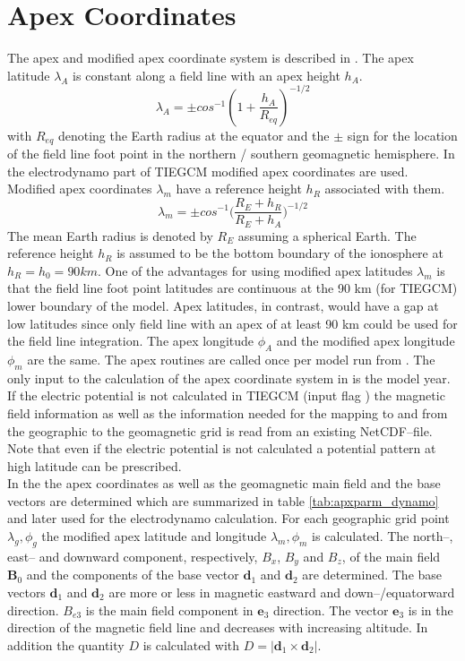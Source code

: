 %
\section{Apex Coordinates}\label{cap:apex_coord}
%
The apex and modified apex coordinate system is described in \cite{rich95}. The
apex latitude $\lambda_A$ is constant along a field line with an apex height
$h_A$. 
%
\begin{equation}
    \lambda_A = \pm cos^{-1} (1+\frac{h_A}{R_{eq}})^{-1/2}
\end{equation}
%
with $R_{eq}$ denoting the Earth radius at the equator and the 
$\pm$ sign for the location of the field line foot point in the
northern / southern  geomagnetic hemisphere. In the electrodynamo part of TIEGCM
modified apex coordinates are used. Modified apex coordinates $\lambda_m$ 
have a reference height $h_R$ associated with them.
%
\begin{equation}
    \lambda_m = \pm cos^{-1} \bigl( \frac{R_E + h_R}{R_E + h_A} \bigr)^{-1/2}
\end{equation}
%
The mean Earth radius is denoted by $R_E$ assuming a spherical Earth.
The reference height $h_R$ is assumed to be the bottom boundary of the ionosphere 
at $h_R = h_0 = 90 km$.
One of the advantages for using modified apex
latitudes $\lambda_m$ is that the field line foot point latitudes are 
continuous at the 90 km (for TIEGCM) lower boundary
of the model. Apex latitudes, in contrast, would have a gap at low
latitudes since only field line with an apex of at least 90 km could be used for 
the field line integration. 
The apex longitude $\phi_A$ and the modified apex longitude $\phi_m$ are the same.
The apex routines are called once per model run from . The
only input to the calculation of the apex coordinate system in  is the model year. If the electric potential is not calculated
in TIEGCM (input flag ) the magnetic field information as 
well as the
information needed for the mapping to and from the geographic to the 
geomagnetic grid
is read from an existing NetCDF--file. Note that even if the electric 
potential is not calculated a potential pattern at high latitude can be
prescribed. \\

In the  the apex coordinates as well as the geomagnetic
main field and the base vectors are determined which are summarized in table
\ref{tab:apxparm_dynamo} and later used for the electrodynamo calculation. 
For each geographic grid point $\lambda_g, \phi_g$ the modified apex latitude and longitude 
$\lambda_m,
\phi_m$ is calculated. The north--, east-- and downward component, respectively, 
$B_x$, $B_y$ and 
$B_z$, of the main  field $\mathbf{B}_0$ and the components of the base vector
$\mathbf{d}_1$ and $\mathbf{d}_2$ are determined. The base vectors 
$\mathbf{d}_1$ 
and $\mathbf{d}_2$ are more or less in magnetic eastward and down--/equatorward
direction. $B_{e3}$ is the main field component in $\mathbf{e}_3$ direction. 
The vector
 $\mathbf{e}_3$  is in the direction of 
the magnetic field line and decreases with increasing altitude. 
In addition the quantity $D$ is calculated with $D = |\mathbf{d}_1
\times \mathbf{d}_2|$. 

